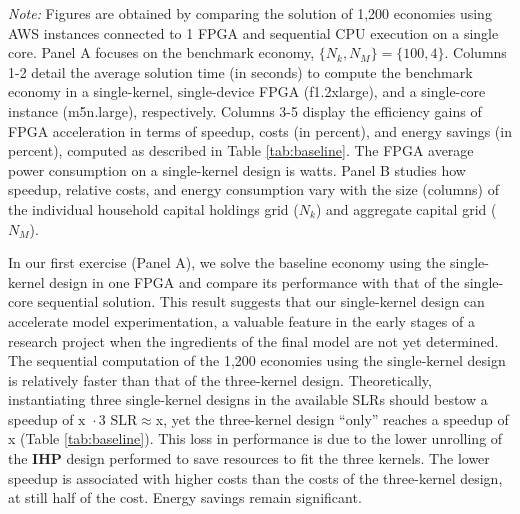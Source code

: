 \documentclass[12pt,american]{article}
\makeatletter
\newcommand{\resultsfolder}{./results}
\newcommand{\devfpgaI}{fpgaI}
\newcommand{\devcpu}{cpu-cores}
\newcommand{\nKMIkI}{nKM4-nk100}
\newcommand{\knlI}{knl-1}
\newcommand{\cpuI}{m5n.large\@\xspace}
\newcommand{\cpucoreI}{1}
\newcommand{\awsinstfI}{f1.2xlarge\@\xspace}
\newcommand{\baselinespeedupFPGAICPUI}{\@\xspace}
\newcommand{\THEORETICALspeedupFPGAICPUI}{}
\newcommand{\fpgaIknlIpowerconsumption}{}
\newcommand{\fpgaspeedIknlICPUI}{}
\newcommand{\numbeconII}{1,200\@\xspace}
\newcommand{\fpgaIknICPUIcostsavingswords}{half of the cost}
\makeatother
\begin{document}
\begin{table}[ht!]
\begin{center}
\begin{subtable}{\textwidth}
\end{subtable}
\end{center}
\small \textit{Note:} Figures are obtained by comparing the solution of \numbeconII economies using AWS instances connected to 1 FPGA and sequential CPU execution on a single core. Panel A focuses on the benchmark economy, $\{N_k,N_M\}=\{100,4\}$. Columns 1-2 detail the average solution time (in seconds) to compute the benchmark economy in a single-kernel, single-device FPGA (\awsinstfI), and a single-core instance (\cpuI), respectively. Columns 3-5 display the efficiency gains of FPGA acceleration in terms of speedup, costs (in percent), and energy savings (in percent), computed as described in Table \ref{tab:baseline}. The FPGA average power consumption on a single-kernel design is \fpgaIknlIpowerconsumption watts. Panel B studies how speedup, relative costs, and energy consumption vary with the size (columns) of the individual household capital holdings grid ($N_k$) and aggregate capital grid ($N_M$). 
\end{table}

In our first exercise (Panel A), we solve the baseline economy using the single-kernel design in one FPGA and compare its performance with that of the single-core sequential solution. This result suggests that our single-kernel design can accelerate model experimentation, a valuable feature in the early stages of a research project when the ingredients of the final model are not yet determined. The sequential computation of the \numbeconII economies using the single-kernel design is relatively faster than that of the three-kernel design. Theoretically, instantiating three single-kernel designs in the available SLRs should bestow a speedup of $\fpgaspeedIknlICPUI\text{x } \cdot 3 \text{ SLR}\approx\THEORETICALspeedupFPGAICPUI $x, yet the three-kernel design ``only'' reaches a speedup of \baselinespeedupFPGAICPUI\hspace{-0.2cm}x (Table \ref{tab:baseline}). This loss in performance is due to the lower unrolling of the \textbf{IHP} design performed to save resources to fit the three kernels. The lower speedup is associated with higher costs than the costs of the three-kernel design, at still \fpgaIknICPUIcostsavingswords. Energy savings remain significant.
\end{document}
